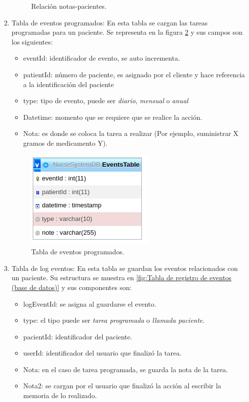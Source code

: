 \begin{enumerate}
\begin{figure}[ht]
	\caption{Relación notas-pacientes.}
	\label{fig:Relación notas-pacientes (base de datos)}
\end{figure}


\pagebreak




\item Tabla de eventos programados: En esta tabla se cargan las tareas programadas para un paciente. Se representa en la figura \ref{fig:Tabla de eventos programados (base de datos)} y sus campos son los siguientes:
\begin{itemize}
\item eventId: identificador de evento, se auto incrementa.
\item patientId: número de paciente, es asignado por el cliente y hace referencia a la identificación del paciente
\item type: tipo de evento, puede ser \textit{diario}, \textit{mensual} o \textit{anual} 
\item Datetime: momento que se requiere que se realice la acción.
\item Nota: es donde se coloca la tarea a realizar (Por ejemplo, suministrar X gramos de medicamento Y).
\end{itemize}


\begin{figure}[ht]
	\centering
	\includegraphics[scale=.70]{./Figures/Events.png}
	\caption{Tabla de eventos programados.}
	\label{fig:Tabla de eventos programados (base de datos)}
\end{figure}

\item Tabla de log eventos: En esta tabla se guardan los eventos relacionados con un paciente. Su estructura se muestra en \ref{fig:Tabla de registro de eventos (base de datos)} y sus componentes son:
\begin{itemize}
\item logEventId: se asigna al guardarse el evento.
\item type: el tipo puede ser \textit{tarea programada} o \textit{llamada paciente}. 
\item pacientId: identificador del paciente. 
\item userId: identificador del usuario que finalizó la tarea. 
\item Nota: en el caso de tarea programada, se guarda la nota de la tarea.
\item Nota2: se cargan por el usuario que finalizó la acción al escribir la memoria de lo realizado.
\end{itemize}




\end{enumerate}
